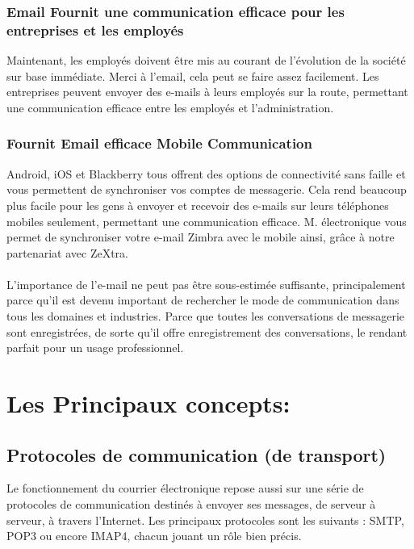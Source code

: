 \documentclass[french]{report}
\begin{document}
\begin{titlepage}
\subsubsection{\LARGE Email Fournit une communication efficace pour les entreprises et les employés}
\LARGE Maintenant, les employés doivent être mis au courant de l’évolution de la société sur base immédiate. Merci à l’email, cela peut se faire assez facilement. Les entreprises peuvent envoyer des e-mails à leurs employés sur la route, permettant une communication efficace entre les employés et l’administration.
\subsubsection{\LARGE Fournit Email efficace Mobile Communication}
\LARGE Android, iOS et Blackberry tous offrent des options de connectivité sans faille et vous permettent de synchroniser vos comptes de messagerie. Cela rend beaucoup plus facile pour les gens à envoyer et recevoir des e-mails sur leurs téléphones mobiles seulement, permettant une communication efficace. M. électronique vous permet de synchroniser votre e-mail Zimbra avec le mobile ainsi, grâce à notre partenariat avec ZeXtra.\\ \\
L’importance de l’e-mail ne peut pas être sous-estimée suffisante, principalement parce qu’il est devenu important de rechercher le mode de communication dans tous les domaines et industries. Parce que toutes les conversations de messagerie sont enregistrées, de sorte qu’il offre enregistrement des conversations, le rendant parfait pour un usage professionnel.
\section{\LARGE Les Principaux concepts: }
\subsection{\LARGE Protocoles de communication (de transport)}
\LARGE Le fonctionnement du courrier électronique repose aussi sur une série de protocoles de communication destinés à envoyer ses messages, de serveur à serveur, à travers l'Internet. Les principaux protocoles sont les suivants : SMTP, POP3 ou encore IMAP4, chacun jouant un rôle bien précis.\\ \\


\end{titlepage}
\end{document}
